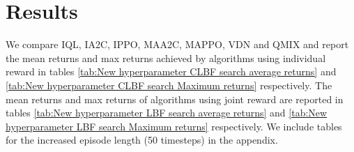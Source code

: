 \documentclass[systems,article,submit,pdftex,moreauthors]{Definitions/mdpi}
\begin{document}



\section{Results}
\label{sec:Results}

We compare IQL, IA2C, IPPO, MAA2C, MAPPO, VDN and QMIX and report the mean returns and max returns achieved by algorithms using individual reward in tables \ref{tab:New hyperparameter CLBF search average returns} and \ref{tab:New hyperparameter CLBF search Maximum returns} respectively. The mean returns and max returns of algorithms using joint reward are reported in tables \ref{tab:New hyperparameter LBF search average returns} and \ref{tab:New hyperparameter LBF search Maximum returns} respectively.
We include tables for the increased episode length (50 timesteps) in the appendix. 

    
\begin{table}[!h]
\caption{Maximum returns and 95\% confidence interval of algorithms using individual reward in selected scenarios over 10 seeds after a hyperparameter search was completed. Bolded values indicate the best result in a scenario.}
\label{tab:New hyperparameter CLBF search Maximum returns}
\end{table}
\end{document}
